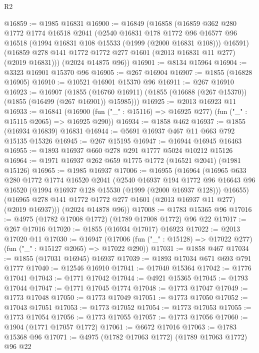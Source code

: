 \begin{lexlean}{R2}
\begin{coremodule}
@16859 := @1985 @16831
@16900 := @16849
    (@16858
      (@16859
        @362
        @280
        @1772
        @1774
        @16518
        @2041
        (@2540
          @16831
          @178
          @1772
          @96
          @16577
          @96
          @16518
          (@1994 @16831 @108 @15533 (@1999 (@2000 @16831 @108)))
          @16591)
        (@16859 @278 @141 @1772 @1772 @277 @1601 (@2013 @16831 @11 @277) (@2019 @16831)))
      (@2024 @14875 @96))
@16901 := @8134 @15964
@16904 := @3323 @16901 @15370 @96
@16905 := @267 @16904
@16907 := @1855 (@16828 @16905)
@16910 := @10521 @16901 @15370 @96
@16911 := @267 @16910
@16923 := @16907
    (@1855 (@16760 @16911) (@1855 (@16688 (@267 @15370)) (@1855 (@16499 (@267 @16901)) @15985)))
@16925 := @2013 @16923 @11
@16933 := @16841
    (@16900 (fun ("_" : @15116) => @16925 @277) (fun ("_" : @15115 @2065) => @16925 @290))
@16934 := @1858 @462
@16937 := @1855 (@16934 @16839) @16831
@16944 := @5691 @16937 @467 @11 @663 @792 @15135 @15326
@16945 := @267 @15195
@16947 := @16944 @16945 @16463
@16955 := @1893 @16937 @660 @278 @291 @1777 @5024 @10212 @15126
@16964 := @1971 @16937 @262 @659 @1775 @1772 (@16521 @2041) (@1981 @15126)
@16965 := @1985 @16937
@17006 := @16955
    (@16964
      (@16965
        @633
        @280
        @1772
        @1774
        @16520
        @2041
        (@2540
          @16937
          @194
          @1772
          @96
          @16643
          @96
          @16520
          (@1994 @16937 @128 @15530 (@1999 (@2000 @16937 @128)))
          @16655)
        (@16965 @278 @141 @1772 @1772 @277 @1601 (@2013 @16937 @11 @277) (@2019 @16937)))
      (@2024 @14878 @96))
@17008 := @1783 @15365 @96
@17016 := @4975 (@1782 @17008 @1772) (@1789 @17008 @1772) @96 @22
@17017 := @267 @17016
@17020 := @1855 (@16934 @17017) @16923
@17022 := @2013 @17020 @11
@17030 := @16947
    (@17006 (fun ("_" : @15128) => @17022 @277) (fun ("_" : @15127 @2065) => @17022 @290))
@17031 := @1858 @467
@17034 := @1855 (@17031 @16945) @16937
@17039 := @1893 @17034 @671 @693 @791 @1777
@17040 := @12546 @16910
@17041 := @17040 @15364
@17042 := @1776 @17041
@17043 := @1771 @17042
@17044 := @4921 @15365
@17045 := @1793 @17044
@17047 := @1771 @17045 @1774
@17048 := @1773 @17047
@17049 := @1773 @17048
@17050 := @1773 @17049
@17051 := @1773 @17050
@17052 := @17043 @17051
@17053 := @1773 @17052
@17054 := @1773 @17053
@17055 := @1773 @17054
@17056 := @1773 @17055
@17057 := @1773 @17056
@17060 := @1904 (@1771 @17057 @1772)
@17061 := @6672 @17016
@17063 := @1783 @15368 @96
@17071 := @4975 (@1782 @17063 @1772) (@1789 @17063 @1772) @96 @22

\end{coremodule}
\end{lexlean}
